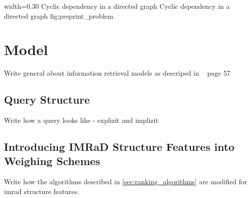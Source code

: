      {width=0.30\textwidth}
      {Cyclic dependency in a directed graph}
      {Cyclic dependency in a directed graph}
      {fig:preprint_problem}

\section{Model}
\label{sec:model}

Write general about information retrieval models as descriped in ~\cite{ModernInvormationRetrieval1999} page 57

\subsection{Query Structure}

Write how a query looks like - explizit and implizit

\subsection{Introducing IMRaD Structure Features into Weighing Schemes}

Write how the algorithms described in \cref{sec:ranking_algorithms} are modified for imrad structure features.
